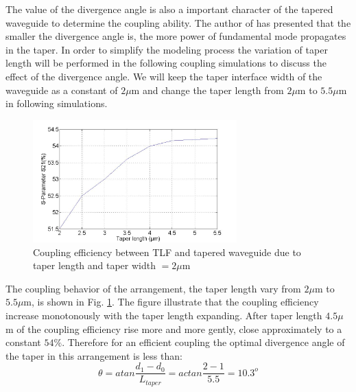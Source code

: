 The value of the divergence angle is also a important character of the tapered waveguide to determine the coupling ability. The author of \cite{study_linear_tapered_waveguides} has presented that the smaller the divergence angle is, the more power of fundamental mode propagates in the taper. In order to simplify the modeling process the variation of taper length will be performed in the following coupling simulations to discuss the effect of the divergence angle.
We will keep the taper interface width of the waveguide as a constant of $2\mu$m and change the taper length from $2\mu$m to $5.5\mu$m in following simulations.  

\begin{figure}[!ht]
\centering
\includegraphics[width=0.7\textwidth]{bilder/tapered_waveguide_dxx}
\caption{Coupling efficiency between TLF and tapered waveguide due to taper length and taper width $= 2\mu$m}
\label{fig:tapered_waveguide_dxx}
\end{figure}
The coupling behavior of the arrangement, the taper length vary from $2\mu$m to $5.5\mu$m, is shown in Fig. \ref{fig:tapered_waveguide_dxx}.  The figure illustrate that the coupling efficiency increase monotonously with the taper length expanding. After taper length $4.5\mu$m of the coupling efficiency rise more and more gently, close approximately to a constant $54\%$. 
Therefore for an efficient coupling the optimal divergence angle of the taper in this arrangement is less than:
\begin{equation}
\theta=atan\frac{d_{1}-d_{0}}{L_{taper}}=actan\frac{2-1}{5.5}=10.3^{o}
\label{eq:divergence_angle}
\end{equation}
